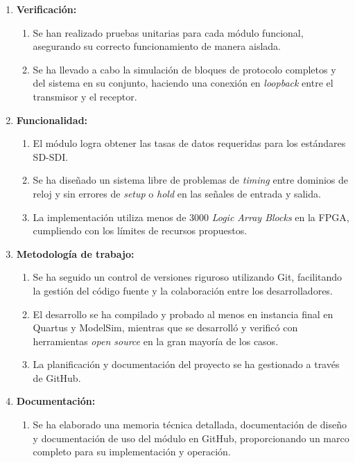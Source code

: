   \begin{enumerate}
      \item \textbf{Verificación:}
      \begin{enumerate}
          \item Se han realizado pruebas unitarias para cada módulo funcional,
          asegurando su correcto funcionamiento de manera aislada.
          \item Se ha llevado a cabo la simulación de bloques de protocolo
          completos y del sistema en su conjunto, haciendo una conexión en
          \textit{loopback} entre el transmisor y el receptor.
      \end{enumerate}
      \item \textbf{Funcionalidad:}
      \begin{enumerate}
          \item El módulo logra obtener las tasas de datos requeridas para los
          estándares SD-SDI\@.
          \item Se ha diseñado un sistema libre de problemas de \textit{timing}
          entre dominios de reloj y sin errores de \textit{setup} o \textit{hold}
          en las señales de entrada y salida.
          \item La implementación utiliza menos de 3000 \textit{Logic Array Blocks}
          en la FPGA, cumpliendo con los límites de recursos propuestos.
      \end{enumerate}
      \item \textbf{Metodología de trabajo:}
      \begin{enumerate}
          \item Se ha seguido un control de versiones riguroso utilizando Git,
          facilitando la gestión del código fuente y la colaboración entre los
          desarrolladores.
          \item El desarrollo se ha compilado y probado al menos en instancia final
          en Quartus y ModelSim, mientras que se desarrolló y verificó con
          herramientas \textit{open source} en la gran mayoría de los casos.
          \item La planificación y documentación del proyecto se ha gestionado a
          través de GitHub.
      \end{enumerate}
      \item \textbf{Documentación:}
      \begin{enumerate}
          \item Se ha elaborado una memoria técnica detallada, documentación de
          diseño y documentación de uso del módulo en GitHub, proporcionando un
          marco completo para su implementación y operación.
      \end{enumerate}
  \end{enumerate}

